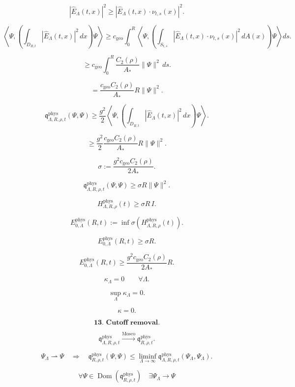 \documentclass[11pt]{article}
\begin{document}
\[
|\widehat E_\Lambda(t,x)|^2
\ge
|\widehat E_\Lambda(t,x)\cdot\nu_{t,s}(x)|^2.
\]

\[
\left\langle
\Psi,
\left(
\int_{D_{R,t}}
|\widehat E_\Lambda(t,x)|^2\,dx
\right)\Psi
\right\rangle
\ge
c_{\mathrm{geo}}
\int_0^R
\left\langle
\Psi,
\left(
\int_{S_{t,s}}
|\widehat E_\Lambda(t,x)\cdot\nu_{t,s}(x)|^2\,dA(x)
\right)\Psi
\right\rangle
ds.
\]

\[
\ge
c_{\mathrm{geo}}
\int_0^R
\frac{C_2(\rho)}{A_\ast}\|\Psi\|^2\,ds.
\]

\[
=
\frac{c_{\mathrm{geo}}C_2(\rho)}{A_\ast}R\|\Psi\|^2.
\]

\[
\mathfrak q_{\Lambda,R,\rho,t}^{\mathrm{phys}}(\Psi,\Psi)
\ge
\frac{g^2}{2}
\left\langle
\Psi,
\left(
\int_{D_{R,t}}
|\widehat E_\Lambda(t,x)|^2\,dx
\right)\Psi
\right\rangle.
\]

\[
\ge
\frac{g^2}{2}
\frac{c_{\mathrm{geo}}C_2(\rho)}{A_\ast}
R\|\Psi\|^2.
\]

\[
\sigma
:=
\frac{g^2c_{\mathrm{geo}}C_2(\rho)}{2A_\ast}.
\]

\[
\mathfrak q_{\Lambda,R,\rho,t}^{\mathrm{phys}}(\Psi,\Psi)
\ge
\sigma R\|\Psi\|^2.
\]

\[
H_{\Lambda,R,\rho}^{\mathrm{phys}}(t)
\ge
\sigma R\,I.
\]

\[
E_{0,\Lambda}^{\mathrm{phys}}(R,t)
:=
\inf\sigma\!\left(H_{\Lambda,R,\rho}^{\mathrm{phys}}(t)\right).
\]

\[
E_{0,\Lambda}^{\mathrm{phys}}(R,t)
\ge
\sigma R.
\]

\[
\boxed{
E_{0,\Lambda}^{\mathrm{phys}}(R,t)
\ge
\frac{g^2c_{\mathrm{geo}}C_2(\rho)}{2A_\ast}R.
}
\]

\[
\kappa_\Lambda=0
\qquad
\forall\Lambda.
\]

\[
\sup_\Lambda\kappa_\Lambda=0.
\]

\[
\kappa=0.
\]

\bigskip

\[
\textbf{13. Cutoff removal.}
\]

\[
\mathfrak q_{\Lambda,R,\rho,t}^{\mathrm{phys}}
\overset{\mathrm{Mosco}}{\longrightarrow}
\mathfrak q_{R,\rho,t}^{\mathrm{phys}}.
\]

\[
\Psi_\Lambda\rightharpoonup\Psi
\quad\Longrightarrow\quad
\mathfrak q_{R,\rho,t}^{\mathrm{phys}}(\Psi,\Psi)
\le
\liminf_{\Lambda\to\infty}
\mathfrak q_{\Lambda,R,\rho,t}^{\mathrm{phys}}(\Psi_\Lambda,\Psi_\Lambda).
\]

\[
\forall\Psi\in
\operatorname{Dom}\!\left(
\mathfrak q_{R,\rho,t}^{\mathrm{phys}}
\right)
\quad
\exists\Psi_\Lambda\to\Psi
\]
\end{document}

